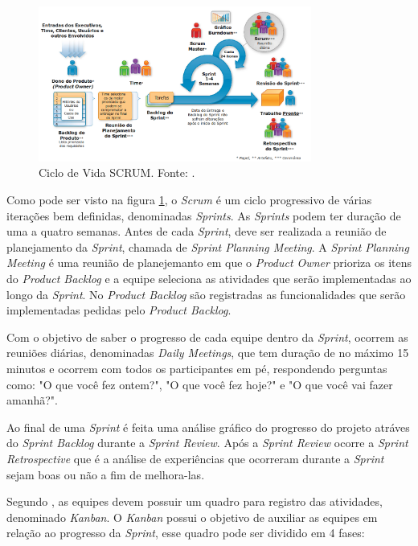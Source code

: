 \begin{figure}[H]
	\centering
	\includegraphics[width=0.8\textwidth]{figuras/ciclo_de_vida_scrum.png}
	\caption{Ciclo de Vida SCRUM. Fonte: .}
	\label{img:ciclo_de_vida_scrum}
\end{figure}

Como pode ser visto na figura \ref{img:ciclo_de_vida_scrum}, o \textit{Scrum} é um ciclo progressivo de várias iterações bem definidas, denominadas \textit{Sprints}. As \textit{Sprints} podem ter duração de uma a quatro semanas. Antes de cada \textit{Sprint}, deve ser realizada a reunião de planejamento da \textit{Sprint}, chamada de \textit{Sprint Planning Meeting}. A \textit{Sprint Planning Meeting} é uma reunião de planejemanto em que o \textit{Product Owner}
prioriza os itens do \textit{Product Backlog} e a equipe seleciona as atividades que serão implementadas ao longo da \textit{Sprint}. No \textit{Product Backlog} são registradas as funcionalidades que serão implementadas pedidas pelo \textit{Product Backlog}. 

Com o objetivo de saber o progresso de cada equipe dentro da \textit{Sprint}, ocorrem as reuniões diárias, denominadas \textit{Daily Meetings}, que tem duração de no máximo 15 minutos e ocorrem com todos os participantes em pé, respondendo perguntas como: "O que você fez ontem?", "O que você fez hoje?" e "O que você vai fazer amanhã?". 

Ao final de uma \textit{Sprint} é feita uma análise gráfico do progresso do projeto atráves do \textit{Sprint Backlog} durante a \textit{Sprint Review}. Após a \textit{Sprint Review} ocorre a \textit{Sprint Retrospective} que é a análise de experiências que ocorreram durante a \textit{Sprint} sejam boas ou não a fim de melhora-las.

Segundo , as equipes devem possuir um quadro para registro das atividades, denominado \textit{Kanban}. O \textit{Kanban} possui o objetivo de auxiliar as equipes em relação ao progresso da \textit{Sprint}, esse quadro pode ser dividido em 4 fases:

